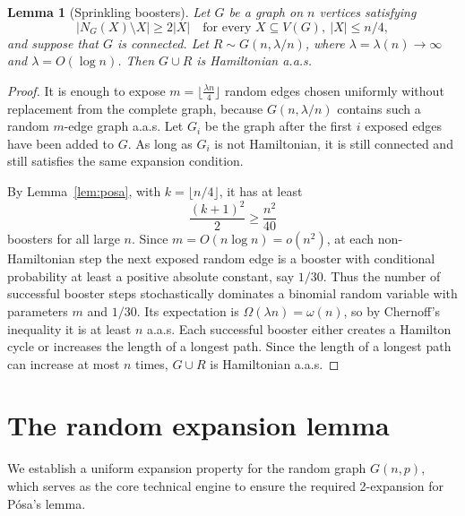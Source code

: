 \documentclass[11pt,reqno]{amsart}
\newtheorem{lemma}[theorem]{Lemma}
\theoremstyle{definition}
\theoremstyle{remark}
\renewcommand\le{\leqslant}
\renewcommand\ge{\geqslant}
\begin{document}
\begin{lemma}[Sprinkling boosters]\label{lem:sprinkling}
Let $G$ be a graph on $n$ vertices satisfying
$$|N_{G}(X)\setminus X|\ge 2|X| \quad \text{for every } X\subseteq V(G), \ |X|\le n/4,$$
and suppose that $G$ is connected. Let $R\sim G(n,\lambda/n)$, where $\lambda=\lambda(n)\rightarrow\infty$ and $\lambda=O(\log n)$. Then $G\cup R$ is Hamiltonian a.a.s.
\end{lemma}
\begin{proof}
It is enough to expose $m=\lfloor\frac{\lambda n}{4}\rfloor$ random edges chosen uniformly without replacement from the complete graph, because $G(n,\lambda/n)$ contains such a random $m$-edge graph a.a.s. Let $G_{i}$ be the graph after the first $i$ exposed edges have been added to $G$. As long as $G_{i}$ is not Hamiltonian, it is still connected and still satisfies the same expansion condition. 

By Lemma~\ref{lem:posa}, with $k=\lfloor n/4\rfloor$, it has at least
$$\frac{(k+1)^{2}}{2}\ge\frac{n^{2}}{40}$$
boosters for all large $n$. Since $m=O(n \log n)=o(n^{2})$, at each non-Hamiltonian step the next exposed random edge is a booster with conditional probability at least a positive absolute constant, say $1/30$. Thus the number of successful booster steps stochastically dominates a binomial random variable with parameters $m$ and $1/30$. Its expectation is $\Omega(\lambda n)=\omega(n)$, so by Chernoff's inequality it is at least $n$ a.a.s. Each successful booster either creates a Hamilton cycle or increases the length of a longest path. Since the length of a longest path can increase at most $n$ times, $G\cup R$ is Hamiltonian a.a.s.
\end{proof}


\medskip

\section{The random expansion lemma}\label{sec:expansion}

We establish a uniform expansion property for the random graph $G(n,p)$, which serves as the core technical engine to ensure the required 2-expansion for P\'osa's lemma.
\end{document}
